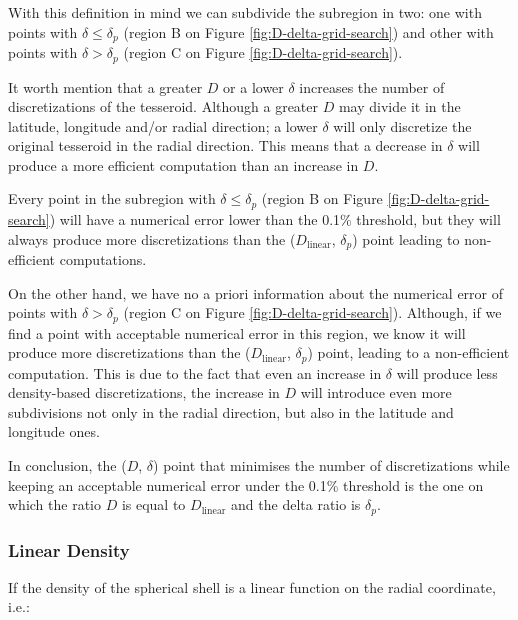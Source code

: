 \documentclass[extra]{gji}
\begin{document}
With this definition in mind we can subdivide the subregion in two: one 
with points with $\delta \le \delta_p$ (region B on Figure 
\ref{fig:D-delta-grid-search}) and other with points with $\delta > 
\delta_p$ (region C on Figure \ref{fig:D-delta-grid-search}).

It worth mention that a greater $D$ or a lower $\delta$ 
increases the number of discretizations of the tesseroid.
Although a greater $D$ may divide it in the latitude, longitude 
and/or radial direction; a lower $\delta$ will only discretize the 
original tesseroid in the radial direction.
This means that a decrease in $\delta$ will produce a more efficient 
computation than an increase in $D$.

Every point in the subregion with $\delta \le \delta_p$ (region B on 
Figure \ref{fig:D-delta-grid-search}) will have a numerical error lower 
than the 0.1\% threshold, but they will always produce more 
discretizations than the ($D_\text{linear}$, $\delta_p$) point leading 
to non-efficient computations.

On the other hand, we have no a priori information about the numerical 
error of points with $\delta > \delta_p$ (region C on 
Figure \ref{fig:D-delta-grid-search}).
Although, if we find a point with acceptable numerical error in this 
region, we know it will produce more discretizations than the 
($D_\text{linear}$, $\delta_p$) point, leading to a non-efficient 
computation.
This is due to the fact that even an increase in $\delta$ will produce 
less density-based discretizations, the increase in $D$ will introduce 
even more subdivisions not only in the radial direction, but 
also in the latitude and longitude ones.

In conclusion, the ($D$, $\delta$) point that minimises the number of 
discretizations while keeping an acceptable numerical error under the 
0.1\% threshold is the one on which the ratio $D$ is equal to 
$D_\text{linear}$ and the delta ratio is $\delta_p$.



\subsubsection{Linear Density}

If the density of the spherical shell is a linear function on the radial coordinate, i.e.:
\end{document}
